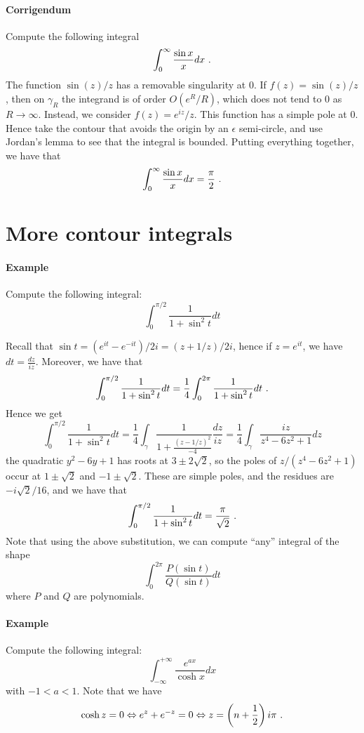 
\paragraph{Corrigendum}

Compute the following integral
\[
\int_0^\infty \frac{\sin x}{x} dx \ \text{.}
\]
The function $\sin (z) /z$ has a removable singularity at $0$.
If $f(z) = \sin(z) / z$, then on $\gamma_R$ the integrand is of order $O(e^R/R)$, which does not tend to $0$ as $R \rightarrow \infty$.
Instead, we consider $f(z) = e^{iz}/z$. This function has a simple pole at $0$.
Hence take the contour that avoids the origin by an $\epsilon$ semi-circle, and use Jordan's lemma to see that the integral is bounded.
Putting everything together, we have that
\[
\int_0^\infty \frac{\sin x}{x} dx = \frac{\pi}{2} \ \text{.}
\]

\section{More contour integrals}

\paragraph{Example}
Compute the following integral:
\[
\int_0^{\pi/2} \frac{1}{1 + \sin^2 t} dt
\]

Recall that $\sin t = (e^{it} - e^{-it}) / 2i = (z + 1/z) / 2i$, hence if $z = e^{it}$, we have $dt = \frac{dz}{iz}$.
Moreover, we have that
\[
\int_0^{\pi/2} \frac{1}{1 + \sin^2 t} dt = \frac{1}{4}\int_0^{2\pi} \frac{1}{1 + \sin^2 t} dt \ \text{.}
\]
Hence we get
\[
\int_0^{\pi/2} \frac{1}{1 + \sin^2 t} dt = \frac{1}{4} \int_\gamma \frac{1}{1 + \frac{(z - 1/z)^2}{-4}} \frac{dz}{iz} = \frac{1}{4} \int_\gamma \frac{iz}{z^4 - 6 z^2 + 1} dz
\]
the quadratic $y^2 - 6y + 1$ has roots at $3 \pm 2 \sqrt{2}$, so the poles of $z / (z^4 - 6z^2 + 1)$ occur at $1 \pm \sqrt{2}$ and $-1 \pm \sqrt{2}$.
These are simple poles, and the residues are $-i\sqrt{2}/16$, and we have that
\[
\int_0^{\pi/2} \frac{1}{1 + \sin^2 t} dt = \frac{\pi}{\sqrt{2}} \ \text{.}
\]
Note that using the above substitution, we can compute ``any'' integral of the shape
\[
\int_0^{2\pi} \frac{P (\sin t)}{Q (\sin t)} dt
\]
where $P$ and $Q$ are polynomials.

\paragraph{Example}
Compute the following integral:
\[
\int_{-\infty}^{+\infty} \frac{e^{a x}}{\cosh x} dx
\]
with $-1 < a < 1$.
Note that we have
\[
\cosh z = 0 \Leftrightarrow e^z + e^{-z} = 0 \Leftrightarrow z = \left( n + \frac{1}{2}\right) i \pi \ \text{.}
\]

